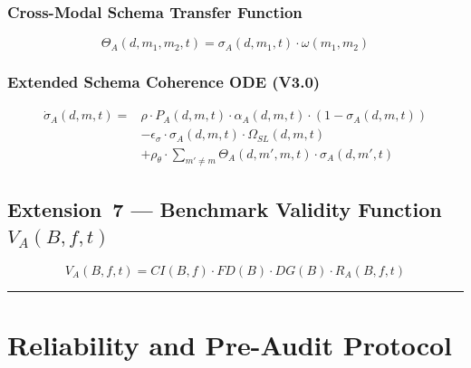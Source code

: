 \subsubsection{Cross-Modal Schema Transfer Function}
\begin{equation}\label{eq:cross-modal-transfer}
\Theta_A(d, m_1, m_2, t) = \sigma_A(d, m_1, t) \cdot \omega(m_1, m_2)
\end{equation}

\subsubsection{Extended Schema Coherence ODE (V3.0)}
\begin{equation}\label{eq:sigma-ode-v3}
\begin{aligned}
\dot{\sigma}_A(d,m,t) = {} & \rho \cdot P_A(d,m,t) \cdot \alpha_A(d,m,t) \cdot (1 - \sigma_A(d,m,t)) \\
& - \epsilon_{\sigma} \cdot \sigma_A(d,m,t) \cdot \Omega_{SL}(d,m,t) \\
& + \rho_{\theta} \cdot \sum_{m' \neq m} \Theta_A(d,m',m,t) \cdot \sigma_A(d,m',t)
\end{aligned}
\end{equation}

\subsection{Extension~7 --- Benchmark Validity Function \texorpdfstring{$V_A(B,f,t)$}{V\_A(B,f,t)}}\label{sec:validity}

\begin{equation}\label{eq:validity-function}
V_A(B,f,t) = CI(B,f) \cdot FD(B) \cdot DG(B) \cdot R_A(B,f,t) %
\end{equation}

\noindent\rule{\linewidth}{0.4pt}


\section{Reliability and Pre-Audit Protocol}\label{sec:reliability}


